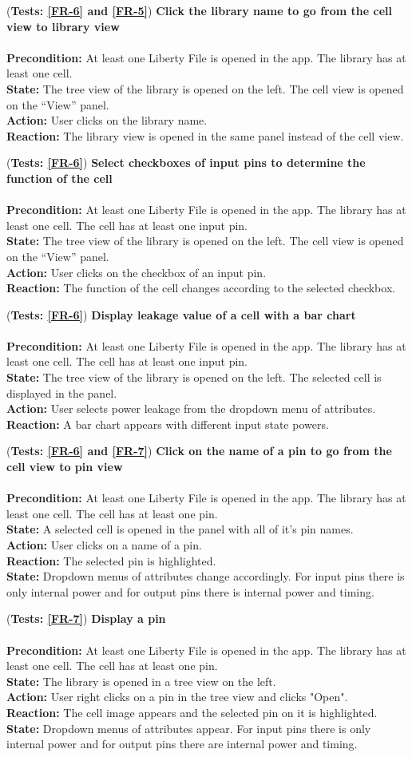 \documentclass[10pt,a4paper]{report}
\newcommand{\precondition}[1]{
    \textbf{Precondition: } #1 \leavevmode \\
}
\newcommand{\action}[1]{
    \textbf{Action: } #1 \leavevmode \\
}
\newcommand{\state}[1]{
    \textbf{State: } #1 \leavevmode \\
}
\newcommand{\reaction}[1]{
    \textbf{Reaction: } #1 \leavevmode \\
}
\newcommand{\GTCDescription}[2]{
    (\textbf{Tests: #1}) \textbf{#2} \leavevmode \\
}
\begin{document}
\begin{GTC}
{}
    \item \GTCDescription{\ref{FR-6} and \ref{FR-5}}{Click the library name to go from the cell view to library view} \leavevmode \\ \precondition{At least one Liberty File is opened in the app. The library has at least one cell.}\state{The tree view of the library is opened on the left. The cell view is opened on the “View” panel.}\action{User clicks on the library name.}\reaction{The library view is opened in the same panel instead of the cell view.
}
    
    \item \GTCDescription{\ref{FR-6}}{Select checkboxes of input pins to determine the function of the cell} \leavevmode \\ \precondition{At least one Liberty File is opened in the app. The library has at least one cell. The cell has at least one input pin.}\state{The tree view of the library is opened on the left. The cell view is opened on the “View” panel.}\action{User clicks on the checkbox of an input pin. }\reaction{The function of the cell changes according to the selected checkbox.}
    
    
    \item \GTCDescription{\ref{FR-6}}{Display leakage value of a cell with a bar chart} \leavevmode \\ \precondition{At least one Liberty File is opened in the app. The library has at least one cell. The cell has at least one input pin.}\state{The tree view of the library is opened on the left. The selected cell is displayed in the panel.}\action{User selects power leakage from the dropdown menu of attributes. }\reaction{A bar chart appears with different input state powers.
}
    
    \item \GTCDescription{\ref{FR-6} and \ref{FR-7}}{Click on the name of a pin to go from the cell view to pin view} \leavevmode \\ \precondition{At least one Liberty File is opened in the app. The library has at least one cell. The cell has at least one pin.}\state{A selected cell is opened in the panel with all of it's pin names.}\action{User clicks on a name of a pin.}\reaction{The selected pin is highlighted.}\state{Dropdown menus of attributes change accordingly. For input pins there is only internal power and for output pins there is internal power and timing.
}
    
    \item \GTCDescription{\ref{FR-7}}{Display a pin} \leavevmode \\ \precondition{At least one Liberty File is opened in the app. The library has at least one cell. The cell has at least one pin.}\state{The library is opened in a tree view on the left.}\action{User right clicks on a pin in the tree view and clicks "Open".}\reaction{The cell image appears and the selected pin on it is highlighted.}\state{Dropdown menus of attributes appear. For input pins there is only internal power and for output pins there are internal power and timing.
}
    

\end{GTC}
\end{document}
